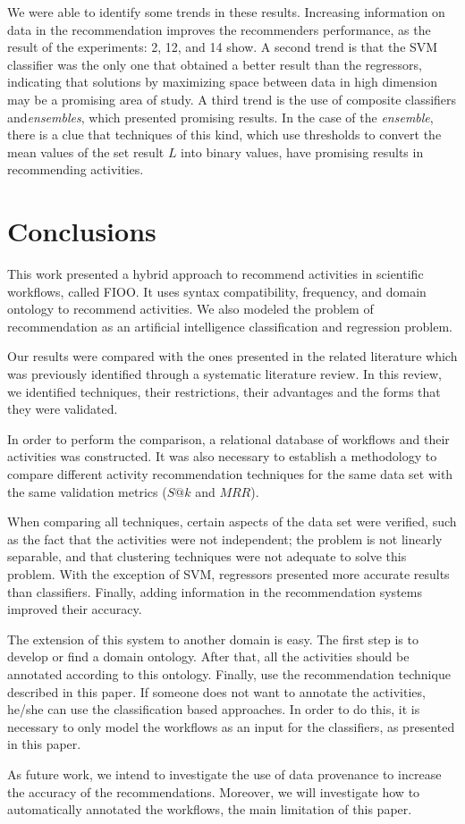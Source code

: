 \documentclass{RITA}
\begin{document}
We were able to identify some trends in these results. Increasing information on data in the recommendation improves the recommenders performance, as the result of the experiments: 2, 12, and 14 show. A second trend is that the SVM classifier was the only one that obtained a better result than the regressors, indicating that solutions by maximizing space between data in high dimension may be a promising area of study. A third trend is the use of composite classifiers and\emph{ensembles}, which presented promising results. In the case of the \emph{ensemble}, there is a clue that techniques of this kind, which use thresholds to convert the mean values of the set result \(L\) into binary values, have promising results in recommending activities.

\section{Conclusions}
This work presented a hybrid approach to recommend activities in scientific workflows, called FIOO. It uses syntax compatibility, frequency, and domain ontology to recommend activities. We also modeled the problem of recommendation as an artificial intelligence classification and regression problem. 

Our results were compared with the ones presented in the related literature which was previously identified through a systematic literature review. In this review, we identified techniques, their restrictions, their advantages and the forms that they were validated. 

In order to perform the comparison, a relational database of workflows and their activities was constructed. It was also necessary to establish a methodology to compare different activity recommendation techniques for the same data set with the same validation metrics (\(S@k\) and \(MRR\)).

When comparing all techniques, certain aspects  of  the data set were verified, such as the fact that the activities were not independent; the problem is not linearly separable, and that clustering techniques were not adequate to solve this problem. With the exception  of  SVM, regressors presented more accurate results than classifiers. Finally, adding information in the recommendation systems improved their accuracy.

The extension of this system to another domain is easy. The first step is to develop or find a domain ontology. After that, all the activities should be annotated according to this ontology. Finally, use the recommendation technique described in this paper. If someone does not want to annotate the activities, he/she can use the classification based approaches. In order to do this, it is necessary to only model the workflows as an input for the classifiers, as presented in this paper.

As future work, we intend to investigate the use of data provenance to increase the accuracy of the recommendations. 
Moreover, we will investigate how to automatically annotated the workflows, the main limitation of this paper.



\end{document}
